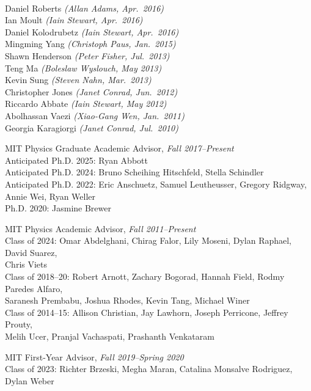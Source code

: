\documentclass[11pt]{article}
\newcommand{\sh}{\phantom{.....}}
\begin{document}
\\ \sh Daniel Roberts \textit{(Allan Adams, Apr.~2016)}
\\ \sh Ian Moult \textit{(Iain Stewart, Apr.~2016)}
\\ \sh Daniel Kolodrubetz \textit{(Iain Stewart, Apr.~2016)}
\\ \sh Mingming Yang \textit{(Christoph Paus, Jan.~2015)}
\\ \sh  Shawn Henderson \textit{(Peter Fisher, Jul.~2013)}
\\ \sh  Teng Ma \textit{(Boleslaw Wyslouch, May 2013)}
\\ \sh  Kevin Sung \textit{(Steven Nahn, Mar.~2013)}
\\ \sh  Christopher Jones \textit{(Janet Conrad, Jun.~2012)}
\\ \sh  Riccardo Abbate \textit{(Iain Stewart, May 2012)}
\\ \sh  Abolhassan Vaezi \textit{(Xiao-Gang Wen, Jan.~2011)}
\\ \sh  Georgia Karagiorgi \textit{(Janet Conrad, Jul.~2010)}
\item MIT Physics Graduate Academic Advisor,  \textit{Fall 2017--Present}
\\ \sh Anticipated Ph.D. 2025: Ryan Abbott
\\ \sh Anticipated Ph.D. 2024:  Bruno Scheihing Hitschfeld, Stella Schindler
\\ \sh Anticipated Ph.D. 2022: Eric Anschuetz, Samuel Leutheusser, Gregory Ridgway, 
\\ \sh \sh Annie Wei, Ryan Weller
\\ \sh Ph.D. 2020: Jasmine Brewer
\item MIT Physics Academic Advisor, \textit{Fall 2011--Present}
\\ \sh Class of 2024: Omar Abdelghani, Chirag Falor, Lily Moseni, Dylan Raphael, David Suarez,
\\ \sh \sh Chris Viets
\\ \sh Class of 2018--20: Robert Arnott, Zachary Bogorad, Hannah Field, Rodmy Paredes Alfaro, 
\\ \sh \sh Saranesh Prembabu, Joshua Rhodes,  Kevin Tang, Michael Winer
\\ \sh Class of 2014--15:  Allison Christian, Jay Lawhorn, Joseph Perricone, Jeffrey Prouty,
\\ \sh \sh Melih Ucer, Pranjal Vachaspati, Prashanth Venkataram
\item MIT First-Year Advisor, \textit{Fall 2019--Spring 2020}
\\ \sh Class of 2023:  Richter Brzeski, Megha Maran, Catalina Monsalve Rodriguez, Dylan Weber
\end{document}
